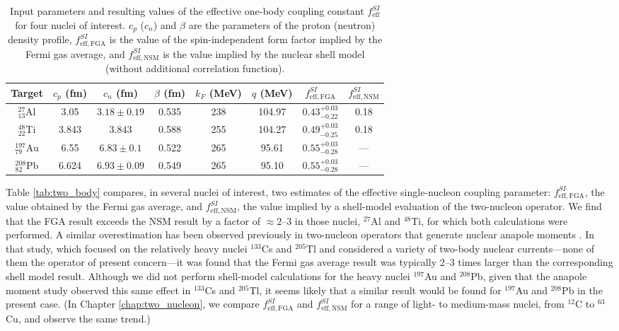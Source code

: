 \documentclass[12pt,letterpaper]{book}
\begin{document}
\begin{table}
\centering
{\renewcommand{\arraystretch}{1.5}
\begin{tabular}{cccccccc}
\hline
\hline
Target & $c_p$ (fm) & $c_n$ (fm) & $\beta$ (fm) & $k_F$ (MeV) & $q$ (MeV)  &  $f_\mathrm{eff,FGA}^{SI}$ & $f_\mathrm{eff,NSM}^{SI}$\\
\hline
$^{27}_{13}$Al & 3.05 & $3.18\pm 0.19$ & 0.535 & 238 & 104.97 & $0.43^{+0.03}_{-0.22}$ & 0.18\\ 
$^{48}_{22}$Ti & 3.843 & $3.843$ & 0.588 & 255 & 104.27 & $0.49^{+0.03}_{-0.25}$ & 0.18\\ 
$^{197}_{79}$Au & 6.55 & $6.83\pm 0.1$ & 0.522 & 265 & 95.61 & $0.55^{+0.03}_{-0.28}$ & ---\\ 
$^{208}_{82}$Pb & 6.624 & $6.93\pm 0.09$ & 0.549 & 265 & 95.10 & $0.55^{+0.03}_{-0.28}$ & ---\\ 
\hline
\hline
\end{tabular}
}
\caption{Input parameters and resulting values of the effective one-body coupling constant $f^{SI}_\mathrm{eff}$ for four nuclei of interest. $c_p$ ($c_n$) and $\beta$ are the parameters of the proton (neutron) density profile, $f^{SI}_\mathrm{eff,FGA}$ is the value of the spin-independent form factor implied by the Fermi gas average, and $f^{SI}_\mathrm{eff,NSM}$ is the value implied by the nuclear shell model (without additional correlation function).}
\label{tab:fga_coherent}
\end{table}

Table \ref{tab:two_body} compares, in several nuclei of interest, two estimates of the effective single-nucleon coupling parameter: $f_\mathrm{eff,FGA}^{SI}$, the value obtained by the Fermi gas average, and $f_\mathrm{eff,NSM}^{SI}$, the value implied by a shell-model evaluation of the two-nucleon operator. We find that the FGA result exceeds the NSM result by a factor of $\approx 2$--$3$ in those nuclei, $^{27}$Al and $^{48}$Ti, for which both calculations were performed. A similar overestimation has been observed previously in two-nucleon operators that generate nuclear anapole moments \cite{2002PhRvC..65d5502H}. In that study, which focused on the relatively heavy nuclei $^{133}$Cs and $^{205}$Tl and considered a variety of two-body nuclear currents---none of them the operator of present concern---it was found that the Fermi gas average result was typically 2--3 times larger than the corresponding shell model result. Although we did not perform shell-model calculations for the heavy nuclei $^{197}$Au and $^{208}$Pb, given that the anapole moment study observed this same effect in $^{133}$Cs and $^{205}$Tl, it seems likely that a similar result would be found for $^{197}$Au and $^{208}$Pb in the present case. (In Chapter \ref{chap:two_nucleon}, we compare $f^{SI}_\mathrm{eff,FGA}$ and $f^{SI}_\mathrm{eff,NSM}$ for a range of light- to medium-mass nuclei, from $^{12}$C to $^{63}$Cu, and observe the same trend.) 
\end{document}
